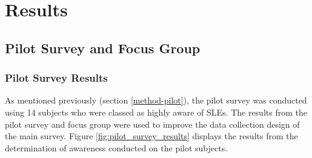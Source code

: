 \chapter{Results}

\section{Pilot Survey and Focus Group}

\subsection{Pilot Survey Results}
As mentioned previously (section \ref{method-pilot}), the pilot survey was conducted using 14 subjects who were classed as highly aware of SLEs. The results from the pilot survey and focus group were used to improve the data collection design of the main survey. Figure \ref{fig:pilot_survey_results} displays the results from the determination of awareness conducted on the pilot subjects.
\paragraph{}


